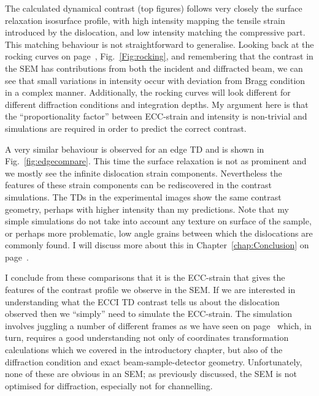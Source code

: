 The calculated dynamical contrast (top figures) follows very closely the surface relaxation isosurface profile, with high intensity mapping the tensile strain introduced by the dislocation, and low intensity matching the compressive part. This matching behaviour is not straightforward to generalise. Looking back at the rocking curves on page~\pageref{Fig:rocking}, Fig.~\ref{Fig:rocking}, and remembering that the contrast in the SEM has contributions from both the incident and diffracted beam, we can see that small variations in intensity occur with deviation from Bragg  condition in a complex manner. Additionally, the rocking curves will look different for different diffraction conditions and integration depths. My argument here is that the ``proportionality factor'' between ECC-strain and intensity is non-trivial and simulations are required in order to predict the correct contrast. 



A very similar behaviour is observed for an edge TD and is shown in Fig.~\ref{fig:edgecompare}. This time the surface relaxation is not as prominent and we mostly see the infinite dislocation strain components. Nevertheless the features of these strain components can be rediscovered in the contrast simulations. The TDs in the experimental images show the same contrast geometry, perhaps with higher intensity than my predictions. Note that my simple simulations do not take into account any texture on surface of the sample, or perhaps more problematic, low angle grains between which the dislocations are commonly found. I will discuss more about this in Chapter~\ref{chap:Conclusion} on page~\pageref{chap:Conclusion}.


I conclude from these comparisons that it is the ECC-strain that gives the features of the contrast profile we observe in the SEM. If we are interested in understanding what the ECCI TD contrast tells us about the dislocation observed then we ``simply'' need to simulate the ECC-strain. The simulation involves juggling a number of different frames as we have seen on page~\pageref{sec:coordinates} which, in turn, requires a good understanding not only of coordinates transformation calculations which we covered in the introductory chapter, but also of the diffraction condition and exact beam-sample-detector geometry. Unfortunately, none of these are obvious in an SEM; as previously discussed, the SEM is not optimised for diffraction, especially not for channelling.






